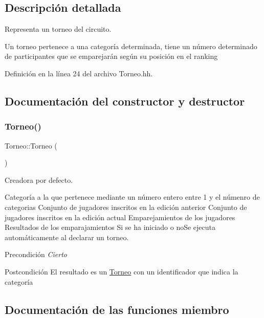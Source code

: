 \subsection{Descripción detallada}
Representa un torneo del circuito. 

Un torneo pertenece a una categoría determinada, tiene un número determinado de participantes que se emparejarán según su posición en el ranking 

Definición en la línea 24 del archivo Torneo.\+hh.



\subsection{Documentación del constructor y destructor}
\mbox{\label{class_torneo_a7bf6d35a7ec8d0e13a0bed8deb8add3e}} 
\subsubsection{\texorpdfstring{Torneo()}{Torneo()}}
{\footnotesize\ttfamily Torneo\+::\+Torneo (\begin{DoxyParamCaption}{ }\end{DoxyParamCaption})}



Creadora por defecto. 

Categoría a la que pertenece mediante un número entero entre 1 y el númenro de categorias Conjunto de jugadores inscritos en la edición anterior Conjunto de jugadores inscritos en la edición actual Emparejamientos de los jugadores Resultados de los emparajamientos Si se ha iniciado o no\+Se ejecuta automáticamente al declarar un torneo. \begin{DoxyPrecond}{Precondición}
{\itshape Cierto} 
\end{DoxyPrecond}
\begin{DoxyPostcond}{Postcondición}
El resultado es un \hyperlink{class_torneo}{Torneo} con un identificador que indica la categoría 
\end{DoxyPostcond}


\subsection{Documentación de las funciones miembro}
\mbox{\label{class_torneo_a7a935f50cc04d337daaddad8adf9e9a2}} 
